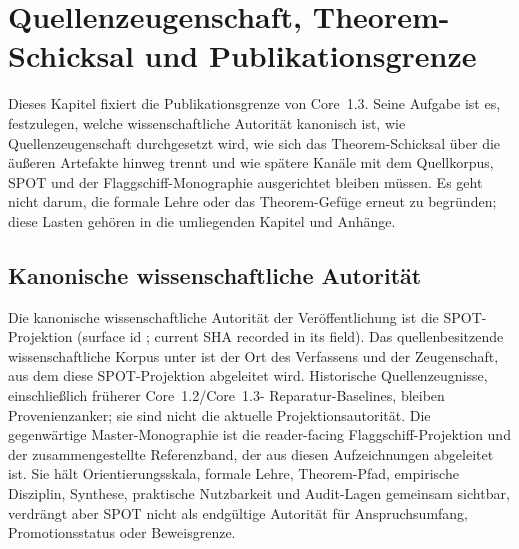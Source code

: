 \section{Quellenzeugenschaft, Theorem-Schicksal und Publikationsgrenze}
\label{sec:oc13-publication-boundary}

Dieses Kapitel fixiert die Publikationsgrenze von Core~1.3. Seine Aufgabe ist
es, festzulegen, welche wissenschaftliche Autorität kanonisch ist, wie
Quellenzeugenschaft durchgesetzt wird, wie sich das Theorem-Schicksal über die
äußeren Artefakte hinweg trennt und wie spätere Kanäle mit dem Quellkorpus,
SPOT und der Flaggschiff-Monographie ausgerichtet bleiben müssen. Es geht
nicht darum, die formale Lehre oder das Theorem-Gefüge erneut zu begründen;
diese Lasten gehören in die umliegenden Kapitel und Anhänge.

\subsection{Kanonische wissenschaftliche Autorität}

Die kanonische wissenschaftliche Autorität der Veröffentlichung ist die
SPOT-Projektion
(surface id ; current SHA recorded in its
 field). Das quellenbesitzende wissenschaftliche
Korpus unter
 ist der Ort des
Verfassens und der Zeugenschaft, aus dem diese SPOT-Projektion abgeleitet wird.
Historische Quellenzeugnisse, einschließlich früherer Core~1.2/Core~1.3-
Reparatur-Baselines, bleiben Provenienzanker; sie sind nicht die aktuelle
Projektionsautorität. Die gegenwärtige Master-Monographie ist die
reader-facing Flaggschiff-Projektion und der zusammengestellte Referenzband,
der aus diesen Aufzeichnungen abgeleitet ist. Sie hält Orientierungsskala,
formale Lehre, Theorem-Pfad, empirische Disziplin, Synthese, praktische
Nutzbarkeit und Audit-Lagen gemeinsam sichtbar, verdrängt aber SPOT nicht als
endgültige Autorität für Anspruchsumfang, Promotionsstatus oder Beweisgrenze.

